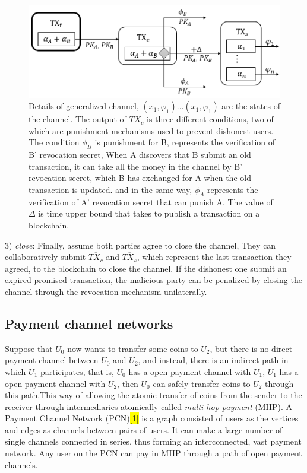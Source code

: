 \documentclass[conference]{IEEEtran}
\begin{document}
\begin{figure}[t]
    \centering
    \includegraphics[scale=0.45]{fig3.png}
    \caption{Details of generalized channel, $(x_1,\varphi_1)...(x_1,\varphi_1)$ are the states of the channel. The output of $TX_c$ 
    is three different conditions, two of which are punishment mechanisms used to prevent dishonest users. The condition $\phi_B$ is
    punishment for B, represents the verification of B’ revocation secret, When A discovers that B submit an old transaction, it can 
    take all the money in the channel by B' revocation secret, which B has exchanged for A when the old transaction is updated.
    and in the same way, $\phi_A$ represents the verification of A’ revocation secret that can punish A. The value of $\Delta$ is time upper 
    bound that takes to publish a transaction on a blockchain.
     }
\end{figure}


3) \emph{close}: Finally, assume both parties agree to close the channel, They can collaboratively submit $\overline{TX_c}$ and 
$\overline{TX_s}$, which represent the last transaction they agreed, to the blockchain to close the channel. If the dishonest one 
submit an expired promised transaction, the malicious party can be penalized by closing the channel through the revocation mechanism unilaterally.


\subsection{Payment channel networks}

Suppose that $U_0$ now wants to transfer some coins to $U_2$, but there is no direct payment channel between $U_0$ and $U_2$, and instead, 
there is an indirect path in which $U_1$ participates, that is, $U_0$ has a open payment channel with $U_1$, $U_1$ has a open payment 
channel with $U_2$, then $U_0$ can safely transfer coins to $U_2$ through this path.This way of allowing the atomic transfer of coins 
from the sender to the receiver through intermediaries atomically called \emph{multi-hop payment} (MHP). A Payment Channel Network (PCN)\colorbox{yellow}{[1]} is 
a graph consisted of users as the vertices and edges as channels between pairs of users. It can make a large number of single channels 
connected in series, thus forming an interconnected, vast payment network. Any user on the PCN can pay in MHP through a path of open 
payment channels. 
\end{document}

